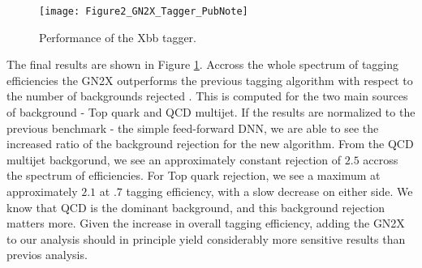 \documentclass[12pt]{article}
\begin{document}

\begin{figure}[t!]
    \centering
    \texttt{[image: Figure2\_GN2X\_Tagger\_PubNote]}
    \caption{Performance of the Xbb tagger.}
    \label{fig:Xbb_tagger}
\end{figure}

The final results are shown in Figure \ref{fig:Xbb_tagger}. Accross the whole
spectrum of tagging efficiencies the GN2X outperforms the previous tagging
algorithm with respect to the number of backgrounds rejected
\cite{boosted_hbbcc_tagger}. This is computed for the two main sources of
background - Top quark and QCD multijet. If the results are normalized to the
previous benchmark - the simple feed-forward DNN, we are able to see the
increased ratio of the background rejection for the new algorithm. From the QCD
multijet backgorund, we see an approximately constant rejection of $2.5$ accross
the spectrum of efficiencies. For Top quark rejection, we see a maximum at
approximately $2.1$ at $.7$ tagging efficiency, with a slow decrease on either
side. We know that QCD is the dominant background, and this background rejection
matters more. Given the increase in overall tagging efficiency, adding the GN2X
to our analysis should in principle yield considerably more sensitive results
than previos analysis.
\end{document}
